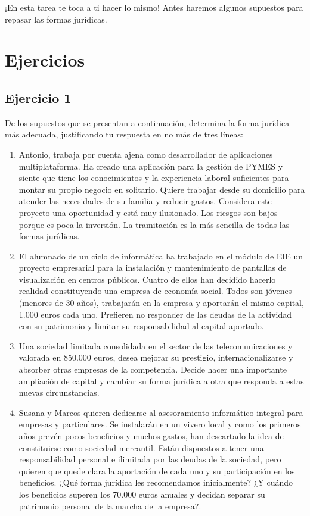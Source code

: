 ¡En esta tarea te toca a ti hacer lo mismo! Antes haremos algunos supuestos para repasar las formas jurídicas.

\section{Ejercicios}


\subsection{Ejercicio 1}
De los supuestos que se presentan a continuación, determina la forma jurídica más adecuada, justificando tu respuesta en no más de tres líneas:

\begin{enumerate}[label=\alph*)]
    \item Antonio, trabaja por cuenta ajena como desarrollador de aplicaciones multiplataforma. Ha creado una aplicación para la gestión de PYMES y siente que tiene los conocimientos y la experiencia laboral suficientes para montar su propio negocio en solitario. Quiere trabajar desde su domicilio para atender las necesidades de su familia y reducir gastos. Considera este proyecto una oportunidad y está muy ilusionado. Los riesgos son bajos porque es poca la inversión. La tramitación es la más sencilla de todas las formas jurídicas.

    \item El alumnado de un ciclo de informática ha trabajado en el módulo de EIE un proyecto empresarial para la instalación y mantenimiento de pantallas de visualización en centros públicos. Cuatro de ellos han decidido hacerlo realidad constituyendo una empresa de economía social. Todos son jóvenes (menores de 30 años), trabajarán en la empresa y aportarán el mismo capital, 1.000 euros cada uno. Prefieren no responder de las deudas de la actividad con su patrimonio y limitar su responsabilidad al capital aportado.

    \item Una sociedad limitada consolidada en el sector de las telecomunicaciones y valorada en 850.000 euros, desea mejorar su prestigio, internacionalizarse y absorber otras empresas de la competencia. Decide hacer una importante ampliación de capital y cambiar su forma jurídica a otra que responda a estas nuevas circunstancias.

    \item Susana y Marcos quieren dedicarse al asesoramiento informático integral para empresas y particulares. Se instalarán en un vivero local y como los primeros años prevén pocos beneficios y muchos gastos, han descartado la idea de constituirse como sociedad mercantil. Están dispuestos a tener una responsabilidad personal e ilimitada por las deudas de la sociedad, pero quieren que quede clara la aportación de cada uno y su participación en los beneficios. ¿Qué forma jurídica les recomendamos inicialmente? ¿Y cuándo los beneficios superen los 70.000 euros anuales y decidan separar su patrimonio personal de la marcha de la empresa?.
\end{enumerate}

